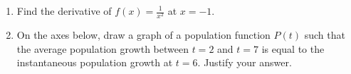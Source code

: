 \documentclass[11pt]{article}
\begin{document}
\begin{enumerate}
  \newpage

\item Find the derivative of $f(x) = \frac{1}{x^2}$ at $x=-1$.
  \vfill

\item On the axes below, draw a graph of a population function $P(t)$
  such that the average population growth between $t=2$ and $t=7$ is
  equal to the instantaneous population growth at $t=6$.  Justify your
  answer.
  \begin{center}
  \end{center}
  
\end{enumerate}
\end{document}
